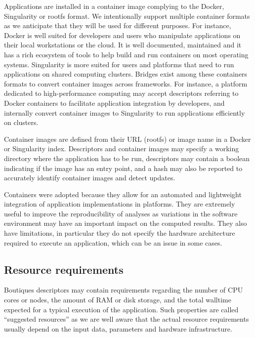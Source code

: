 \documentclass{article}
\newcommand{\boutiques}{Boutiques\xspace}
\begin{document}
Applications are installed in a container image complying to the
Docker, Singularity or rootfs format. We intentionally support
multiple container formats as we anticipate that they will be used for
different purposes. For instance, Docker is well suited for developers
and users who manipulate applications on their local workstations or the
cloud. It is well documented, maintained and it has a rich ecosystem of
tools to help build and run containers on most operating systems. Singularity
is more suited for users and platforms that need to run applications
on shared computing clusters. Bridges exist among these containers
formats to convert container images across frameworks. For instance, a
platform dedicated to high-performance computing may accept descriptors
referring to Docker containers to facilitate application integration
by developers, and internally convert container images to Singularity
to run applications efficiently on clusters.

Container images are defined from their URL (rootfs) or image name in
a Docker or Singularity index. Descriptors and container images may
specify a working directory where the application has to be run,
descriptors may contain a boolean indicating if the image has an entry
point, and a hash may also be reported to accurately identify
container images and detect updates.

Containers were adopted because they allow for an automated and
lightweight integration of application implementations in
platforms. They are extremely useful to improve the reproducibility of
analyses as variations in the software environment may have an
important impact on the computed results. They also have limitations,
in particular they do not specify the hardware architecture required
to execute an application, which can be an issue in some cases.


\subsection{Resource requirements}

\boutiques descriptors may contain requirements regarding the number
of CPU cores or nodes, the amount of RAM or disk storage, and the
total walltime expected for a typical execution of the
application. Such properties are called ``suggested resources'' as we
are well aware that the actual resource requirements usually depend on
the input data, parameters and hardware infrastructure.
\end{document}

